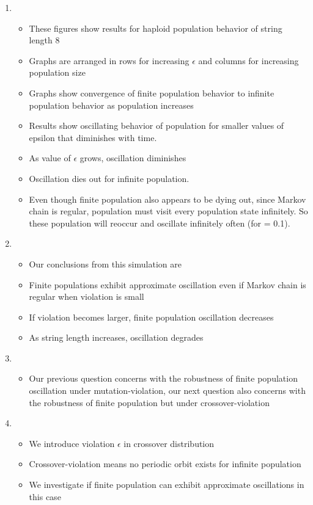\documentclass{article}
\begin{document}
\begin{enumerate}
\item
  \begin{itemize}
  \item These figures show results for haploid population behavior of string length 8
  \item Graphs are arranged in rows for increasing $\epsilon$ and columns for increasing population size
  \item Graphs show convergence of finite population behavior to infinite population behavior as population increases
  \item Results show oscillating behavior of population for smaller values of epsilon that diminishes with time.
  \item As value of $\epsilon$ grows, oscillation diminishes
  \item Oscillation dies out for infinite population.
  \item Even though finite population also appears to be dying out, since Markov chain is regular, population must visit every population state infinitely. 
  So these population will reoccur and oscillate infinitely often (for = 0.1).  
  \end{itemize}
  
  
\item
  \begin{itemize}
  \item Our conclusions from this simulation are
  \item Finite populations exhibit approximate oscillation even if Markov chain is regular when violation is small
  \item If violation becomes larger, finite population oscillation decreases
  \item As string length increases, oscillation degrades
  \end{itemize}
  
\item
  \begin{itemize}
  \item Our previous question concerns with the robustness of finite population oscillation under mutation-violation, 
  our next question also concerns with the robustness of finite population but under crossover-violation  
  \end{itemize}

\item
  \begin{itemize}
  \item We introduce violation $\epsilon$ in crossover distribution
  \item Crossover-violation means no periodic orbit exists for infinite population
  \item We investigate if finite population can exhibit approximate oscillations in this case     
  \end{itemize}
  

\end{enumerate}
\end{document}
